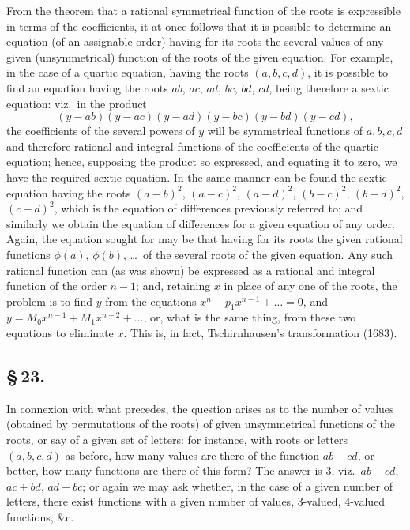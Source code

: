 \documentclass[11pt,a4paper]{article}
\begin{document}
From the theorem that a rational symmetrical function of the roots is expressible in terms of the coefficients, it at once follows that it is possible to determine an equation (of an assignable order) having for its roots the several values of any given (unsymmetrical) function of the roots of the given equation. For example, in the case of a quartic equation, having the roots $(a, b, c, d)$, it is possible to find an equation having the roots $ab$, $ac$, $ad$, $bc$, $bd$, $cd$, being therefore a sextic equation: viz.\ in the product
\[
(y - ab)(y - ac)(y - ad)(y - bc)(y - bd)(y - cd),
\]
the coefficients of the several powers of $y$ will be symmetrical functions of $a, b, c, d$ and therefore rational and integral functions of the coefficients of the quartic equation; hence, supposing the product so expressed, and equating it to zero, we have the required sextic equation. In the same manner can be found the sextic equation having the roots $(a - b)^{2}$, $(a - c)^{2}$, $(a - d)^{2}$, $(b - c)^{2}$, $(b - d)^{2}$, $(c - d)^{2}$, which is the equation of differences previously referred to; and similarly we obtain the equation of differences for a given equation of any order. Again, the equation sought for may be that having for its roots the given rational functions $\phi(a)$, $\phi(b)$, \ldots\ of the several roots of the given equation. Any such rational function can (as was shown) be expressed as a rational and integral function of the order $n - 1$; and, retaining $x$ in place of any one of the roots, the problem is to find $y$ from the equations $x^{n} - p_{1}x^{n-1} + \ldots = 0$, and $y = M_{0}x^{n-1} + M_{1}x^{n-2} + \ldots$, or, what is the same thing, from these two equations to eliminate $x$. This is, in fact, Tschirnhausen's transformation (1683).

\subsection*{\S\,23.}

In connexion with what precedes, the question arises as to the number of values (obtained by permutations of the roots) of given unsymmetrical functions of the roots, or say of a given set of letters: for instance, with roots or letters $(a, b, c, d)$ as before, how many values are there of the function $ab + cd$, or better, how many functions are there of this form? The answer is 3, viz.\ $ab + cd$, $ac + bd$, $ad + bc$; or again we may ask whether, in the case of a given number of letters, there exist functions with a given number of values, 3-valued, 4-valued functions, \&c.
\end{document}
